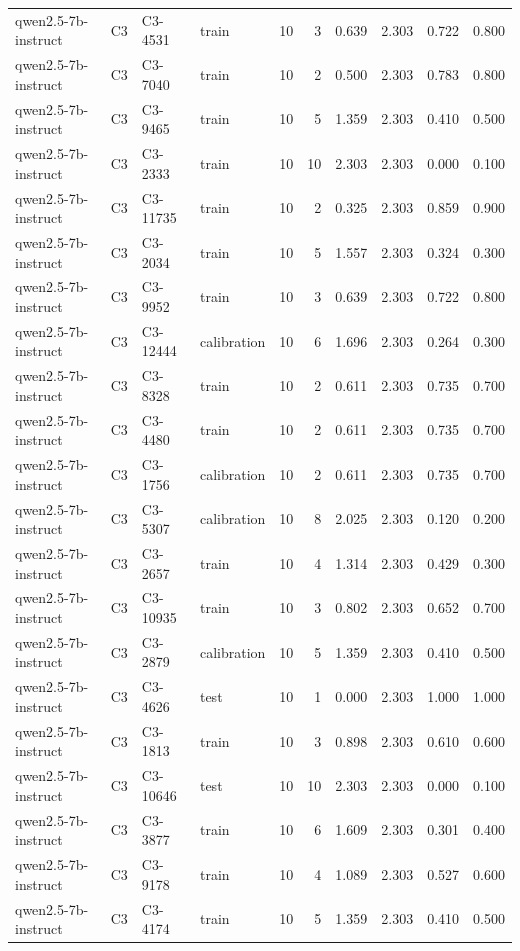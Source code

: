 \begin{table}
\begin{tabular}{llllrrrrrr}
qwen2.5-7b-instruct & C3 & C3-4531 & train & 10 & 3 & 0.639 & 2.303 & 0.722 & 0.800 \\
qwen2.5-7b-instruct & C3 & C3-7040 & train & 10 & 2 & 0.500 & 2.303 & 0.783 & 0.800 \\
qwen2.5-7b-instruct & C3 & C3-9465 & train & 10 & 5 & 1.359 & 2.303 & 0.410 & 0.500 \\
qwen2.5-7b-instruct & C3 & C3-2333 & train & 10 & 10 & 2.303 & 2.303 & 0.000 & 0.100 \\
qwen2.5-7b-instruct & C3 & C3-11735 & train & 10 & 2 & 0.325 & 2.303 & 0.859 & 0.900 \\
qwen2.5-7b-instruct & C3 & C3-2034 & train & 10 & 5 & 1.557 & 2.303 & 0.324 & 0.300 \\
qwen2.5-7b-instruct & C3 & C3-9952 & train & 10 & 3 & 0.639 & 2.303 & 0.722 & 0.800 \\
qwen2.5-7b-instruct & C3 & C3-12444 & calibration & 10 & 6 & 1.696 & 2.303 & 0.264 & 0.300 \\
qwen2.5-7b-instruct & C3 & C3-8328 & train & 10 & 2 & 0.611 & 2.303 & 0.735 & 0.700 \\
qwen2.5-7b-instruct & C3 & C3-4480 & train & 10 & 2 & 0.611 & 2.303 & 0.735 & 0.700 \\
qwen2.5-7b-instruct & C3 & C3-1756 & calibration & 10 & 2 & 0.611 & 2.303 & 0.735 & 0.700 \\
qwen2.5-7b-instruct & C3 & C3-5307 & calibration & 10 & 8 & 2.025 & 2.303 & 0.120 & 0.200 \\
qwen2.5-7b-instruct & C3 & C3-2657 & train & 10 & 4 & 1.314 & 2.303 & 0.429 & 0.300 \\
qwen2.5-7b-instruct & C3 & C3-10935 & train & 10 & 3 & 0.802 & 2.303 & 0.652 & 0.700 \\
qwen2.5-7b-instruct & C3 & C3-2879 & calibration & 10 & 5 & 1.359 & 2.303 & 0.410 & 0.500 \\
qwen2.5-7b-instruct & C3 & C3-4626 & test & 10 & 1 & 0.000 & 2.303 & 1.000 & 1.000 \\
qwen2.5-7b-instruct & C3 & C3-1813 & train & 10 & 3 & 0.898 & 2.303 & 0.610 & 0.600 \\
qwen2.5-7b-instruct & C3 & C3-10646 & test & 10 & 10 & 2.303 & 2.303 & 0.000 & 0.100 \\
qwen2.5-7b-instruct & C3 & C3-3877 & train & 10 & 6 & 1.609 & 2.303 & 0.301 & 0.400 \\
qwen2.5-7b-instruct & C3 & C3-9178 & train & 10 & 4 & 1.089 & 2.303 & 0.527 & 0.600 \\
qwen2.5-7b-instruct & C3 & C3-4174 & train & 10 & 5 & 1.359 & 2.303 & 0.410 & 0.500 \\

\end{tabular}
\end{table}
